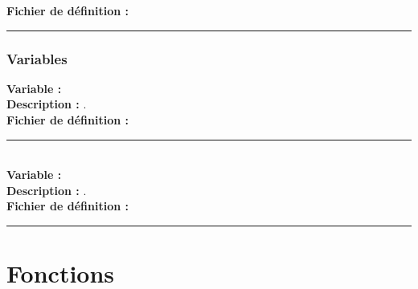 \documentclass[a4paper,10pt]{article}
\begin{document}
\textbf{Fichier de définition :} \textbf{\color{lime}\color{white}}\\[1\baselineskip]



\color{blue}\par\noindent\rule{\textwidth}{0.4pt}\color{white}

\color{blue}
\subsubsection{Variables}\color{white}
\textbf{Variable :} \textbf{\color{orange}\color{white}}\\[1\baselineskip]

\textbf{Description :} .\\[1\baselineskip]

\textbf{Fichier de définition :} \textbf{\color{lime}\color{white}}\\[1\baselineskip]




\par\noindent\rule{\textwidth}{0.4pt}\\[1\baselineskip]

\textbf{Variable :} \textbf{\color{orange}\color{white}}\\[1\baselineskip]

\textbf{Description :} .\\[1\baselineskip]

\textbf{Fichier de définition :} \textbf{\color{lime}\color{white}}\\[1\baselineskip]



\color{red}\par\noindent\rule{\textwidth}{0.4pt}\color{white}

\color{red}
\section{Fonctions}\color{white}

\color{green}
\subsection{}\color{white}
\end{document}

